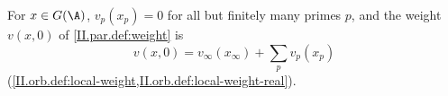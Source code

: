 For $x\in G(\A)$, $v_p(x_p)=0$ for all but finitely many primes $p$, and the weight $v(x,0)$ of \cref{II.par.def:weight} is
\[
  v(x,0)=v_\infty(x_\infty)+\sum_pv_p(x_p)
\]
(\cref{II.orb.def:local-weight,II.orb.def:local-weight-real}).

